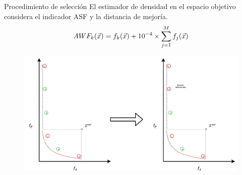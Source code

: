 \documentclass{beamer}
\begin{document}
\begin{frame}{Procedimiento de selección}
El estimador de densidad en el espacio objetivo considera el indicador ASF y la distancia de mejoría.
\begin{equation}\label{eqn:extremes}
\scriptsize
AWF_k (\vec{x}) = f_k(\vec{x}) + 10^{-4} \times  \sum_{j=1}^M f_j( \vec{x} )
\end{equation}

\begin{figure}[H]
\centering
\scriptsize
\includegraphics[scale=0.35]{Images/Atipico.pdf}
\label{fig:Atipico}
\end{figure}
\end{frame}
\end{document}
